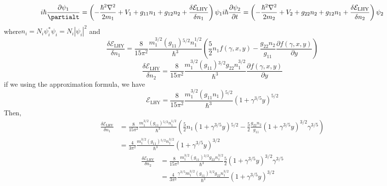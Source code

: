 \begin{equation}
i \hbar \frac{\partial\psi_1}{\partialt}=\left(-\frac{\hbar^2\nabla^2}{2m_1}+V_1+g_{11}n_1+g_{12}n_2+\frac{\delta  \mathcal{E}_{\text{LHY}}}{\delta n_1}\right)\psi _1\\
i \hbar \frac{\partial \psi _2}{\partial t}=\left(-\frac{\hbar ^2\nabla ^2}{2m_2}+V_2+g_{22}n_2+g_{12}n_1+\frac{\delta  \mathcal{E}_{\text{LHY}}}{\delta n_2}\right)\psi _2
\end{equation}
where$n_i=N_i\psi _i^*\psi _i=N_i|\psi _i|^2$ and 
\begin{equation}
\frac{\delta  \mathcal{E}_{\text{LHY}}}{\delta  n_1}=\frac{8}{15\pi^2}\frac{m_1^{3/2}\left(g_{11}\right){}^{5/2}n_1^{1/2}}{\hbar^3}\left(\frac{5}{2}n_1f(\gamma,x,y)-\frac{g_{22}n_2}{g_{11}}\frac{\partial f(\gamma ,x,y)}{\partial y}\right)
\end{equation}
\begin{equation}
\frac{\delta  \mathcal{E}_{\text{LHY}}}{\delta  n_2}=\frac{8}{15\pi^2}\frac{m_1^{3/2}\left(g_{11}\right){}^{3/2}g_{22}n_1^{3/2}}{\hbar ^3}\frac{\partial
f(\gamma ,x,y)}{\partial y}
\end{equation}
if we using the approximation formula, we have
\begin{equation}
\mathcal{E}_{\text{LHY}}=\frac{8}{15\pi ^2}\frac{m_1^{3/2}\left(g_{11}n_1\right){}^{5/2}}{\hbar ^3}\left(1+\gamma ^{3/5}y\right)^{5/2}
\end{equation}
Then, 
\begin{equation}
\begin{split}
\frac{\delta  \mathcal{E}_{\text{LHY}}}{\delta  n_1}&=\frac{8}{15\pi^2}\frac{m_1^{3/2}\left(g_{11}\right){}^{5/2}n_1^{1/2}}{\hbar^3}\left(\frac{5}{2}n_1\left(1+\gamma^{3/5}y\right){}^{5/2}-\frac{5}{2}\frac{g_{22}n_2}{g_{11}}\left(1+\gamma ^{3/5}y\right)^{3/2}\gamma ^{3/5}\right)\\
&=\frac{4}{3\pi^2}\frac{m_1^{3/2}\left(g_{11}\right){}^{5/2}n_1^{3/2}}{\hbar^3}\left(1+\gamma^{3/5}y\right)^{3/2}
\end{split}
\end{equation}
\begin{equation}
\begin{split}
\frac{\delta  \mathcal{E}_{\text{LHY}}}{\delta n_2}&=\frac{8}{15\pi^2}\frac{m_1^{3/2}\left(g_{11}\right){}^{3/2}g_{22}n_1^{3/2}}{\hbar^3}\frac{5}{2}\left(1+\gamma^{3/5}y\right)^{3/2}\gamma ^{3/5}\\
&=\frac{4}{3\pi^2}\frac{\gamma^{3/5}m_1^{3/2}\left(g_{11}\right){}^{3/2}g_{22}n_1^{3/2}}{\hbar^3}\left(1+\gamma ^{3/5}y\right)^{3/2}
\end{split}
\end{equation}
